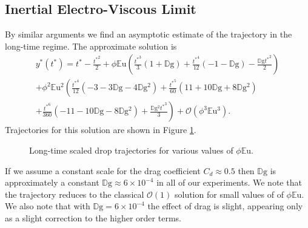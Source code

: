 \documentclass[12pt,a4paper,oneside]{book}
\begin{document}
\subsection{Inertial Electro-Viscous Limit}
By similar arguments we find an asymptotic estimate of the trajectory in the long-time regime. The approximate solution is 
\begin{eqnarray*}
\label{perturb_viscous}
&{y^*}({t^*}) = {t^*} - \frac{{t^*}^{2}}{2} + \phi\mathbb{E}\mbox{u} \left(\frac{{t^*}^{3}}{3} \left(1 + \mathbb{D}\mbox{g}\right) + \frac{{t^*}^{4}}{12} \left(-1 - \mathbb{D}\mbox{g}\right) - \frac{\mathbb{D}\mbox{g} {t^*}^{2}}{2}\right)&  \\
&+ \phi^2 \mathbb{E}\mbox{u}^{2} \left(\frac{{t^*}^{4}}{12} \left(-3 - 3 \mathbb{D}\mbox{g} - 4 \mathbb{D}\mbox{g}^{2}\right) + \frac{{t^*}^{5}}{60} \left(11 + 10 \mathbb{D}\mbox{g} + 8 \mathbb{D}\mbox{g}^{2}\right) \right. & \\
&\left. + \frac{{t^*}^{6}}{360} \left(-11 - 10 \mathbb{D}\mbox{g} - 8 \mathbb{D}\mbox{g}^{2}\right) + \frac{\mathbb{D}\mbox{g}^{2} {t^*}^{3}}{3}\right)
 + \mathcal{O}(\phi^3 \mathbb{E}\mbox{u}^3).& \nonumber
\end{eqnarray*}
Trajectories for this solution are shown in Figure \ref{fig:long_times}.
\begin{figure}[htb]
    \centering
    
    \caption{Long-time scaled drop trajectories for various values of $\phi \mathbb{E}\mbox{u}$.}
     \label{fig:long_times}
\end{figure}
If we assume a constant scale for the drag coefficient $C_d \approx 0.5$ then $\mathbb{D}\mbox{g}$ is approximately a constant $\mathbb{D}\mbox{g} \approx 6 \times 10^{-4}$ in all of our experiments. We note that the trajectory reduces to the classical $\mathcal{O}(1)$ solution for small values of of $\phi \mathbb{E}\mbox{u}$. We also note that with $\mathbb{D}\mbox{g} = 6 \times 10^{-4}$ the effect of drag is slight, appearing only as a slight correction to the higher order terms.
 
\end{document}
